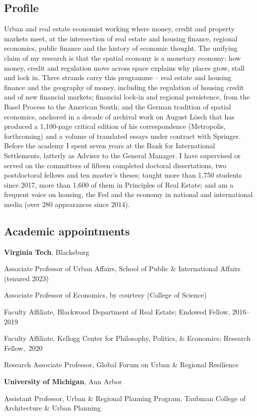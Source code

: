 \documentclass[letter,11pt]{article}
\newlength{\cvlabelw}
\newenvironment{cvlist}[1][2.5cm]{%
  \setlength{\cvlabelw}{#1}%
  \begin{list}{}{%
    \setlength{\leftmargin}{\cvlabelw}\setlength{\labelwidth}{\cvlabelw}%
    \setlength{\labelsep}{0pt}\setlength{\itemindent}{0pt}\setlength{\listparindent}{0pt}%
    \setlength{\itemsep}{4pt}\setlength{\parsep}{0pt}\setlength{\topsep}{3pt}\setlength{\partopsep}{0pt}%
    \renewcommand{\makelabel}[1]{##1\hfil}}}{\end{list}}
\begin{document}
\subsection*{Profile}
\noindent Urban and real estate economist working where money, credit and property markets meet, at the intersection of real estate and housing finance, regional economics, public finance and the history of economic thought. The unifying claim of my research is that the spatial economy is a monetary economy: how money, credit and regulation move across space explains why places grow, stall and lock in. Three strands carry this programme -- real estate and housing finance and the geography of money, including the regulation of housing credit and of new financial markets; financial lock-in and regional persistence, from the Basel Process to the American South; and the German tradition of spatial economics, anchored in a decade of archival work on August L\"{o}sch that has produced a 1,100-page critical edition of his correspondence (Metropolis, forthcoming) and a volume of translated essays under contract with Springer. Before the academy I spent seven years at the Bank for International Settlements, latterly as Adviser to the General Manager. I have supervised or served on the committees of fifteen completed doctoral dissertations, two postdoctoral fellows and ten master's theses; taught more than 1,750 students since 2017, more than 1,600 of them in Principles of Real Estate; and am a frequent voice on housing, the Fed and the economy in national and international media (over 280 appearances since 2014).

\subsection*{Academic appointments}
\noindent\textbf{Virginia Tech}, Blacksburg
\begin{cvlist}[2.3cm]
\item[2015 --] Associate Professor of Urban Affairs, School of Public \& International Affairs (tenured 2023)
\item[2017 --] Associate Professor of Economics, by courtesy (College of Science)
\item[2015 --] Faculty Affiliate, Blackwood Department of Real Estate; Endowed Fellow, \mbox{2016--2019}
\item[2016 --] Faculty Affiliate, Kellogg Center for Philosophy, Politics, \& Economics; Research Fellow,~2020
\item[2015 -- 2022] Research Associate Professor, Global Forum on Urban \& Regional Resilience
\end{cvlist}
\vspace{4pt}\noindent\textbf{University of Michigan}, Ann Arbor
\begin{cvlist}[2.3cm]
\item[2010 -- 2014] Assistant Professor, Urban \& Regional Planning Program, Taubman College of Architecture \& Urban Planning
\end{cvlist}
\end{document}
